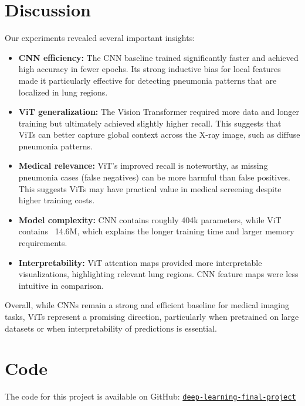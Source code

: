 \documentclass{article}
\begin{document}
\section{Discussion}

Our experiments revealed several important insights:

\begin{itemize}
    \item \textbf{CNN efficiency:} The CNN baseline trained significantly faster and achieved high accuracy in fewer epochs. Its strong inductive bias for local features made it particularly effective for detecting pneumonia patterns that are localized in lung regions.
    \item \textbf{ViT generalization:} The Vision Transformer required more data and longer training but ultimately achieved slightly higher recall. This suggests that ViTs can better capture global context across the X-ray image, such as diffuse pneumonia patterns.
    \item \textbf{Medical relevance:} ViT’s improved recall is noteworthy, as missing pneumonia cases (false negatives) can be more harmful than false positives. This suggests ViTs may have practical value in medical screening despite higher training costs.
    \item \textbf{Model complexity:} CNN contains roughly 404k parameters, while ViT contains ~14.6M, which explains the longer training time and larger memory requirements.
    \item \textbf{Interpretability:} ViT attention maps provided more interpretable visualizations, highlighting relevant lung regions. CNN feature maps were less intuitive in comparison.
\end{itemize}

Overall, while CNNs remain a strong and efficient baseline for medical imaging tasks, ViTs represent a promising direction, particularly when pretrained on large datasets or when interpretability of predictions is essential.

\section{Code}
The code for this project is available on GitHub: 
\href{https://github.com/Avital-Fine/deep-learning-final-project}{\texttt{deep-learning-final-project}}



\end{document}
